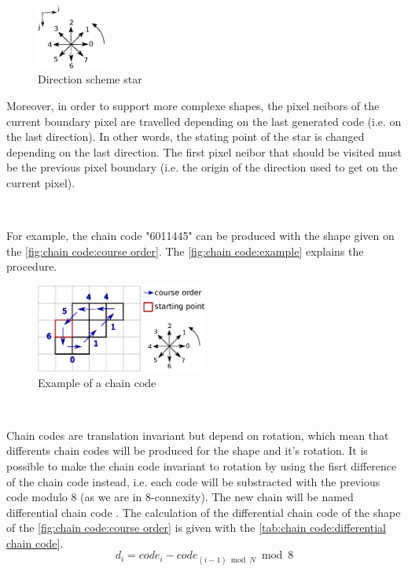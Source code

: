 \begin{figure}[H]
	\centering
	\includegraphics[width=0.2\textwidth]{images/chain_code/direction_scheme_star}
	\caption{Direction scheme star \cite{bib:chain:ParametreGeometriqueChaineFreeman}}
	\label{fig:chain code:direction scheme star}	
\end{figure}


Moreover, in order to support more complexe shapes, the pixel neibors of the current boundary pixel are travelled depending on the last generated code (i.e. on the last direction). In other words, the stating point of the star is changed depending on the last direction. The first pixel neibor that should be visited must be the previous pixel boundary (i.e. the origin of the direction used to get on the current pixel). 

~~

For example, the chain code "6011445" can be produced with the shape given on the \vref{fig:chain code:course order}. The \vref{fig:chain code:example} explains the procedure. 
\begin{figure}[H]
	\centering
	\includegraphics[width=0.5\textwidth]{images/chain_code/example}
	\caption{Example of a chain code}
	\label{fig:chain code:example}	
\end{figure}

~~

Chain codes are translation invariant but depend on rotation, which mean that differents chain codes will be produced for the shape and it's rotation. It is possible to make the chain code invariant to rotation by using the fisrt difference of the chain code instead, i.e. each code will be substracted with the previous code modulo 8 (as we are in 8-connexity). The new chain will be named differential chain code \cite{bib:chain:RepresentationAndDescription}. The calculation of the differential chain code of the shape of the \vref{fig:chain code:course order} is given with the \vref{tab:chain code:differential chain code}.
\begin{equation} \label{eq:chain code:differential chain code}
d_i = code_i - code_{(i-1) \bmod N} \bmod 8
\end{equation}


